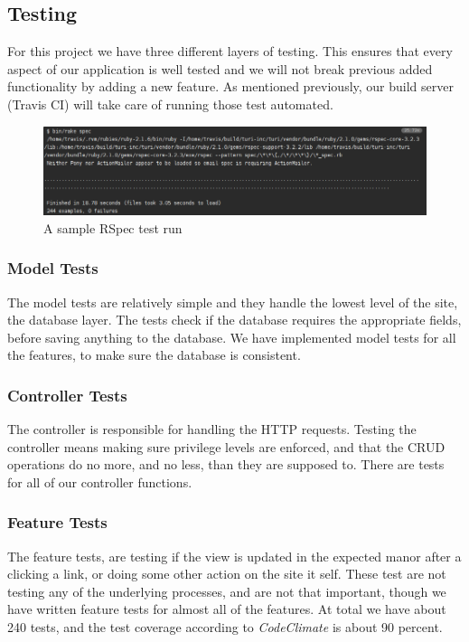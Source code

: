 \documentclass[a4paper]{article}
\begin{document}
\subsection{Testing}
For this project we have three different layers of testing. This ensures that every aspect of our application is well tested and we will not break previous added functionality by adding a new feature. As mentioned previously, our build server (Travis CI) will take care of running those test automated.

\begin{figure}
  \begin{center}
    \includegraphics[scale=0.40]{pictures/rake_tests.png}
    \caption{A sample RSpec test run}
    \label{fig:}
  \end{center}
\end{figure}

\subsubsection{Model Tests}
The model tests are relatively simple and they handle the lowest level of the site, the database layer. The tests check if the database requires the appropriate fields, before saving anything to the database. We have implemented model tests for all the features, to make sure the database is consistent.
\\

\subsubsection{Controller Tests}
The controller is responsible for handling the HTTP requests. Testing the controller means making sure privilege levels are enforced, and that the CRUD operations do no more, and no less, than they are supposed to. There are tests for all of our controller functions.
\\

\subsubsection{Feature Tests}
The feature tests, are testing if the view is updated in the expected manor after a clicking a link, or doing some other action on the site it self. These test are not testing any of the underlying processes, and are not that important, though we have written feature tests for almost all of the features. 
At total we have about 240 tests, and the test coverage according to \textit{CodeClimate} is about 90 percent. \\
\end{document}
